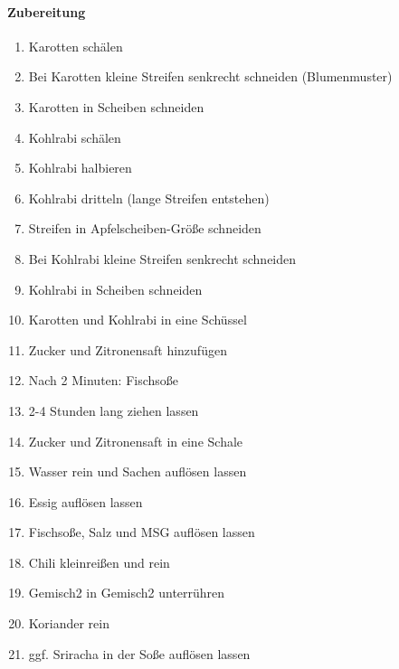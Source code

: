 \paragraph{Zubereitung}
\begin{enumerate}[noitemsep]
	\item Karotten schälen
	\item Bei Karotten kleine Streifen senkrecht schneiden (Blumenmuster)
	\item Karotten in Scheiben schneiden
	\item Kohlrabi schälen
	\item Kohlrabi halbieren
	\item Kohlrabi dritteln (lange Streifen entstehen)
	\item Streifen in Apfelscheiben-Größe schneiden
	\item Bei Kohlrabi kleine Streifen senkrecht schneiden
	\item Kohlrabi in Scheiben schneiden
	\item Karotten und Kohlrabi in eine Schüssel 
	\item Zucker und Zitronensaft hinzufügen
	\item Nach 2 Minuten: Fischsoße
	\item 2-4 Stunden lang ziehen lassen
	\item Zucker und Zitronensaft in eine Schale
	\item Wasser rein und Sachen auflösen lassen
	\item Essig auflösen lassen
	\item Fischsoße, Salz und MSG auflösen lassen
	\item Chili kleinreißen und rein
	\item Gemisch2 in Gemisch2 unterrühren
	\item Koriander rein
	\item ggf. Sriracha in der Soße auflösen lassen
\end{enumerate}
